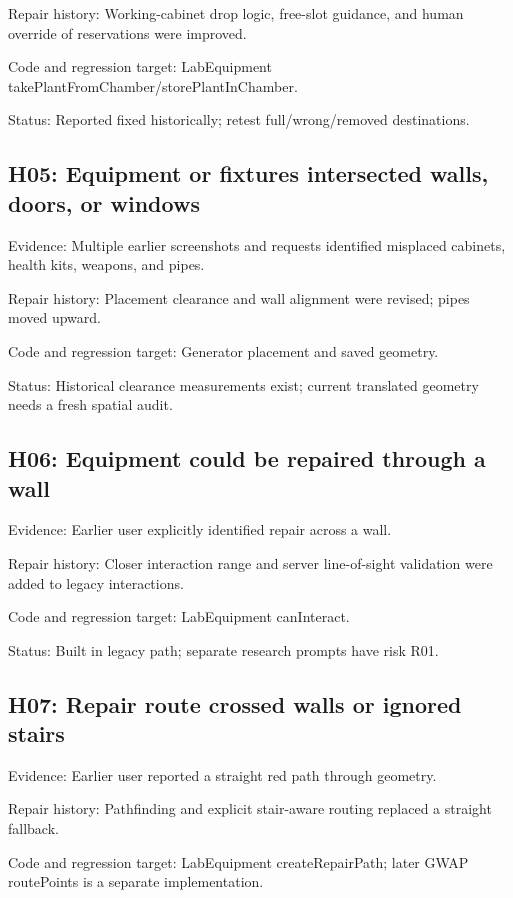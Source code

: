 Repair history: Working-cabinet drop logic, free-slot guidance, and human override of reservations were improved.\allowbreak{}

Code and regression target: LabEquipment takePlantFromChamber/\allowbreak{}storePlantInChamber.\allowbreak{}

Status: Reported fixed historically; retest full/\allowbreak{}wrong/\allowbreak{}removed destinations.\allowbreak{}

\subsection{H05: Equipment or fixtures intersected walls, doors, or windows}
Evidence: Multiple earlier screenshots and requests identified misplaced cabinets, health kits, weapons, and pipes.\allowbreak{}

Repair history: Placement clearance and wall alignment were revised; pipes moved upward.\allowbreak{}

Code and regression target: Generator placement and saved geometry.\allowbreak{}

Status: Historical clearance measurements exist; current translated geometry needs a fresh spatial audit.\allowbreak{}

\subsection{H06: Equipment could be repaired through a wall}
Evidence: Earlier user explicitly identified repair across a wall.\allowbreak{}

Repair history: Closer interaction range and server line-of-sight validation were added to legacy interactions.\allowbreak{}

Code and regression target: LabEquipment canInteract.\allowbreak{}

Status: Built in legacy path; separate research prompts have risk R01.\allowbreak{}

\subsection{H07: Repair route crossed walls or ignored stairs}
Evidence: Earlier user reported a straight red path through geometry.\allowbreak{}

Repair history: Pathfinding and explicit stair-aware routing replaced a straight fallback.\allowbreak{}

Code and regression target: LabEquipment createRepairPath; later GWAP routePoints is a separate implementation.\allowbreak{}

